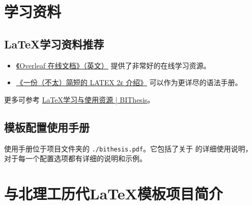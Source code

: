 \begin{appendices}
  \chapter{学习资料} \label{resources}

  \section{\LaTeX 学习资料推荐}
  \begin{itemize}[nosep]
    \item \href{https://www.overleaf.com/learn/latex/Tutorials}{《Overleaf 在线文档》（英文）} 提供了非常好的在线学习资源。
    \item \href{https://texdoc.org/serve/lshort-zh-cn.pdf/0}{《一份（不太）简短的 LATEX 2ε 介绍》} 可以作为更详尽的语法手册。
  \end{itemize}

  更多可参考 \href{https://bithesis.bitnp.net/guide/resources.html}{\LaTeX 学习与使用资源 | BIThesis}。

  \section{\BIThesis 模板配置使用手册}
  \BIThesis{} 使用手册位于项目文件夹的 \verb|./bithesis.pdf|。它包括了关于 \BIThesis{} 的详细使用说明，
      对于每一个配置选项都有详细的说明和示例。
      
  \chapter{\BIThesis 与北理工历代\LaTeX{}模板项目简介}
  

\end{appendices}
